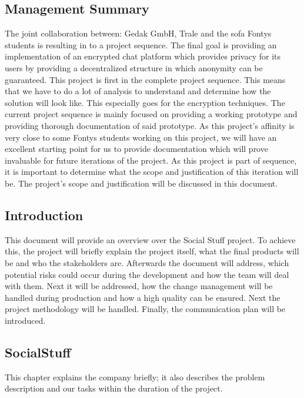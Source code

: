 \subsection{Management Summary}\label{subsec:management-summary}

The joint collaboration between: Gedak GmbH, Trale and the \ac{sofa} Fontys students is resulting in to a project
sequence.
The final goal is providing an implementation of an encrypted chat platform which provides privacy for its users by
providing a decentralized structure in which anonymity can be guaranteed.
This project is first in the complete project sequence.
This means that we have to do a lot of analysis to understand and determine how the solution will look like.
This especially goes for the encryption techniques.
The current project sequence is mainly focused on providing a working prototype and providing thorough documentation
of said prototype.
As this project’s affinity is very close to some Fontys students working on this project, we will have an
excellent starting point for us to provide documentation which will prove invaluable for future iterations of the
project.
As this project is part of sequence, it is important to determine what the scope and justification of this iteration
will be.
The project's scope and justification will be discussed in this document.

\subsection{Introduction}\label{subsec:introduction}
This document will provide an overview over the Social Stuff project.
To achieve this, the project will briefly explain the project itself, what the final products will be and who the
stakeholders are.
Afterwards the document will address, which potential risks could occur during the development and how the team will
deal with them.
Next it will be addressed, how the change management will be handled during production and how a high quality can be
ensured.
Next the project methodology will be handled.
Finally, the communication plan will be introduced.

\subsection{SocialStuff}\label{subsec:socialstuff}

This chapter explains the company briefly;
it also describes the problem description and our tasks within the duration of the project.

